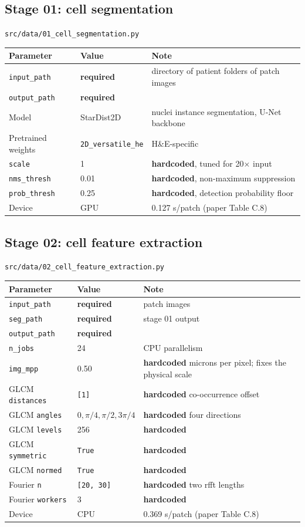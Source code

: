 \documentclass[10pt,a4paper]{article}
\newcommand{\req}{\textcolor{eosin}{\textbf{required}}}
\newcommand{\hc}{\textcolor{haem}{\textbf{hardcoded}}}
\begin{document}
\subsection{Stage 01: cell segmentation}
\noindent\texttt{src/data/01\_cell\_segmentation.py}

\begin{longtable}{@{}p{4.6cm}p{3.4cm}p{7.6cm}@{}}
\toprule
\textbf{Parameter} & \textbf{Value} & \textbf{Note} \\
\midrule \endhead
\texttt{input\_path} & \req & directory of patient folders of patch images \\
\texttt{output\_path} & \req & \\
Model & StarDist2D & nuclei instance segmentation, U-Net backbone \\
Pretrained weights & \texttt{2D\_versatile\_he} & H\&E-specific \\
\texttt{scale} & 1 & \hc, tuned for 20$\times$ input \\
\texttt{nms\_thresh} & 0.01 & \hc, non-maximum suppression \\
\texttt{prob\_thresh} & 0.25 & \hc, detection probability floor \\
Device & GPU & 0.127 s/patch (paper Table C.8) \\
\bottomrule
\end{longtable}

\subsection{Stage 02: cell feature extraction}
\noindent\texttt{src/data/02\_cell\_feature\_extraction.py}

\begin{longtable}{@{}p{4.6cm}p{3.4cm}p{7.6cm}@{}}
\toprule
\textbf{Parameter} & \textbf{Value} & \textbf{Note} \\
\midrule \endhead
\texttt{input\_path} & \req & patch images \\
\texttt{seg\_path} & \req & stage 01 output \\
\texttt{output\_path} & \req & \\
\texttt{n\_jobs} & 24 & CPU parallelism \\
\texttt{img\_mpp} & 0.50 & \hc{} microns per pixel; fixes the physical scale \\
GLCM \texttt{distances} & \texttt{[1]} & \hc{} co-occurrence offset \\
GLCM \texttt{angles} & $0, \pi/4, \pi/2, 3\pi/4$ & \hc{} four directions \\
GLCM \texttt{levels} & 256 & \hc \\
GLCM \texttt{symmetric} & \texttt{True} & \hc \\
GLCM \texttt{normed} & \texttt{True} & \hc \\
Fourier \texttt{n} & \texttt{[20, 30]} & \hc{} two rfft lengths \\
Fourier \texttt{workers} & 3 & \hc \\
Device & CPU & 0.369 s/patch (paper Table C.8) \\
\bottomrule
\end{longtable}
\end{document}
